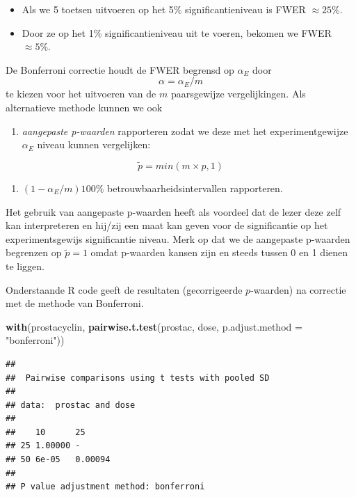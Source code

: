 \documentclass[
  12pt,dutch]{book}
\newenvironment{Shaded}{\begin{snugshade}}{\end{snugshade}}
\newcommand{\AttributeTok}[1]{\textcolor[rgb]{0.13,0.29,0.53}{#1}}
\newcommand{\FunctionTok}[1]{\textcolor[rgb]{0.13,0.29,0.53}{\textbf{#1}}}
\newcommand{\NormalTok}[1]{#1}
\newcommand{\StringTok}[1]{\textcolor[rgb]{0.31,0.60,0.02}{#1}}
\providecommand{\tightlist}{%
  \setlength{\itemsep}{0pt}\setlength{\parskip}{0pt}}
\theoremstyle{definition}
\theoremstyle{definition}
\theoremstyle{definition}
\theoremstyle{definition}
\theoremstyle{remark}
\begin{document}
\begin{itemize}
\tightlist
\item
  Als we 5 toetsen uitvoeren op het 5\% significantieniveau is FWER \(\approx 25\%\).
\item
  Door ze op het 1\% significantieniveau uit te voeren, bekomen we FWER \(\approx 5\%\).
\end{itemize}

De Bonferroni correctie houdt de FWER begrensd op \(\alpha_E\) door \[\alpha=\alpha_E/m\] te kiezen voor het uitvoeren van de \(m\) paarsgewijze vergelijkingen.
Als alternatieve methode kunnen we ook

\begin{enumerate}
\def\labelenumi{\arabic{enumi}.}
\tightlist
\item
  \emph{aangepaste p-waarden} rapporteren zodat we deze met het experimentgewijze \(\alpha_E\) niveau kunnen vergelijken:
\end{enumerate}

\[\tilde{p}=min(m\times p,1)\]

\begin{enumerate}
\def\labelenumi{\arabic{enumi}.}
\setcounter{enumi}{1}
\tightlist
\item
  \((1-\alpha_E/m)100\%\) betrouwbaarheidsintervallen rapporteren.
\end{enumerate}

Het gebruik van aangepaste p-waarden heeft als voordeel dat de lezer deze zelf kan interpreteren en hij/zij een maat kan geven voor de significantie op het experimentsgewijs significantie niveau.
Merk op dat we de aangepaste p-waarden begrenzen op \(\tilde{p}=1\) omdat p-waarden kansen zijn en steeds tussen 0 en 1 dienen te liggen.

Onderstaande R code geeft de resultaten (gecorrigeerde \(p\)-waarden) na correctie met de methode van Bonferroni.

\begin{Shaded}
\begin{Highlighting}[]
\FunctionTok{with}\NormalTok{(prostacyclin, }\FunctionTok{pairwise.t.test}\NormalTok{(prostac, dose, }\AttributeTok{p.adjust.method =} \StringTok{"bonferroni"}\NormalTok{))}
\end{Highlighting}
\end{Shaded}

\begin{verbatim}
## 
##  Pairwise comparisons using t tests with pooled SD 
## 
## data:  prostac and dose 
## 
##    10      25     
## 25 1.00000 -      
## 50 6e-05   0.00094
## 
## P value adjustment method: bonferroni
\end{verbatim}
\end{document}
